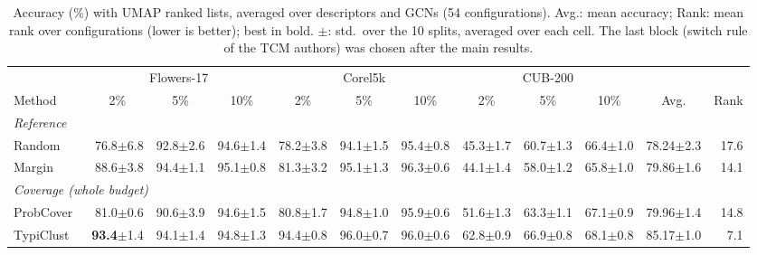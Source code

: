 \begin{table}[t]
\centering
\caption{Accuracy (\%) with UMAP ranked lists, averaged over descriptors and GCNs (54 configurations). Avg.: mean accuracy; Rank: mean rank over configurations (lower is better); best in bold. $\pm$: std.\ over the 10 splits, averaged over each cell. The last block (switch rule of the TCM authors) was chosen after the main results.}
\label{tab:sota-umap-std}
\footnotesize
\setlength{\tabcolsep}{3.5pt}
\begin{adjustbox}{max width=\textwidth}
\begin{tabular}{lrrrrrrrrrrr}
\toprule
& \multicolumn{3}{c}{Flowers-17} & \multicolumn{3}{c}{Corel5k} & \multicolumn{3}{c}{CUB-200} & & \\
\cmidrule(lr){2-4}\cmidrule(lr){5-7}\cmidrule(lr){8-10}
Method & \multicolumn{1}{c}{2\%} & \multicolumn{1}{c}{5\%} & \multicolumn{1}{c}{10\%} & \multicolumn{1}{c}{2\%} & \multicolumn{1}{c}{5\%} & \multicolumn{1}{c}{10\%} & \multicolumn{1}{c}{2\%} & \multicolumn{1}{c}{5\%} & \multicolumn{1}{c}{10\%} & \multicolumn{1}{c}{Avg.} & \multicolumn{1}{c}{Rank} \\
\midrule
\multicolumn{12}{l}{\textit{Reference}} \\
\quad Random & 76.8{\scriptsize$\pm$6.8} & 92.8{\scriptsize$\pm$2.6} & 94.6{\scriptsize$\pm$1.4} & 78.2{\scriptsize$\pm$3.8} & 94.1{\scriptsize$\pm$1.5} & 95.4{\scriptsize$\pm$0.8} & 45.3{\scriptsize$\pm$1.7} & 60.7{\scriptsize$\pm$1.3} & 66.4{\scriptsize$\pm$1.0} & 78.24{\scriptsize$\pm$2.3} & 17.6 \\
\quad Margin~\cite{scheffer2001active} & 88.6{\scriptsize$\pm$3.8} & 94.4{\scriptsize$\pm$1.1} & 95.1{\scriptsize$\pm$0.8} & 81.3{\scriptsize$\pm$3.2} & 95.1{\scriptsize$\pm$1.3} & 96.3{\scriptsize$\pm$0.6} & 44.1{\scriptsize$\pm$1.4} & 58.0{\scriptsize$\pm$1.2} & 65.8{\scriptsize$\pm$1.0} & 79.86{\scriptsize$\pm$1.6} & 14.1 \\
\multicolumn{12}{l}{\textit{Coverage (whole budget)}} \\
\quad ProbCover~\cite{yehuda2022active} & 81.0{\scriptsize$\pm$0.6} & 90.6{\scriptsize$\pm$3.9} & 94.6{\scriptsize$\pm$1.5} & 80.8{\scriptsize$\pm$1.7} & 94.8{\scriptsize$\pm$1.0} & 95.9{\scriptsize$\pm$0.6} & 51.6{\scriptsize$\pm$1.3} & 63.3{\scriptsize$\pm$1.1} & 67.1{\scriptsize$\pm$0.9} & 79.96{\scriptsize$\pm$1.4} & 14.8 \\
\quad TypiClust~\cite{hacohen2022active} & \textbf{93.4}{\scriptsize$\pm$1.4} & 94.1{\scriptsize$\pm$1.4} & 94.8{\scriptsize$\pm$1.3} & 94.4{\scriptsize$\pm$0.8} & 96.0{\scriptsize$\pm$0.7} & 96.0{\scriptsize$\pm$0.6} & 62.8{\scriptsize$\pm$0.9} & 66.9{\scriptsize$\pm$0.8} & 68.1{\scriptsize$\pm$0.8} & 85.17{\scriptsize$\pm$1.0} & 7.1 \\

\end{tabular}
\end{adjustbox}
\end{table}
